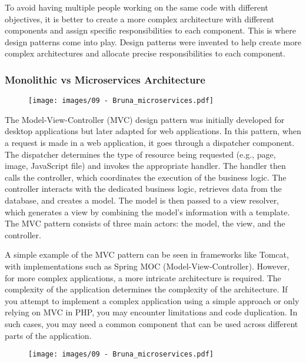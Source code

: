 To avoid having multiple people working on the same code with different
objectives, it is better to create a more complex architecture with
different components and assign specific responsibilities to each
component. This is where design patterns come into play. Design patterns
were invented to help create more complex architectures and allocate
precise responsibilities to each component.

\subsubsection{Monolithic vs Microservices Architecture}

\begin{figure}[!h]
    \centering
    \texttt{[image: images/09 - Bruna\_microservices.pdf]}
\end{figure}

The Model-View-Controller (MVC) design pattern was initially developed
for desktop applications but later adapted for web applications. In this
pattern, when a request is made in a web application, it goes through a
dispatcher component. The dispatcher determines the type of resource
being requested (e.g., page, image, JavaScript file) and invokes the
appropriate handler. The handler then calls the controller, which
coordinates the execution of the business logic. The controller
interacts with the dedicated business logic, retrieves data from the
database, and creates a model. The model is then passed to a view
resolver, which generates a view by combining the model's information
with a template. The MVC pattern consists of three main actors: the
model, the view, and the controller.

A simple example of the MVC pattern can be seen in frameworks like
Tomcat, with implementations such as Spring MOC (Model-View-Controller).
However, for more complex applications, a more intricate architecture is
required. The complexity of the application determines the complexity of
the architecture. If you attempt to implement a complex application
using a simple approach or only relying on MVC in PHP, you may encounter
limitations and code duplication. In such cases, you may need a common
component that can be used across different parts of the application.

\begin{figure}[!h]
    \centering
    \texttt{[image: images/09 - Bruna\_microservices.pdf]}
\end{figure}

